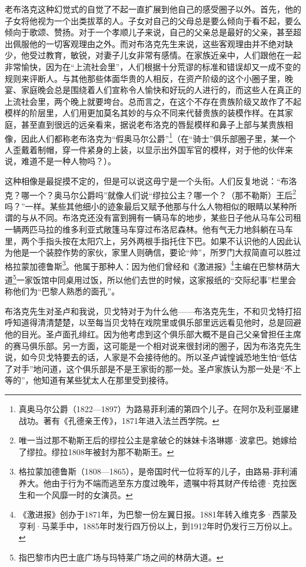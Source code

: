 \par 老布洛克这种幻觉式的自觉了不起一直扩展到他自己的感受圈子以外。首先，他的子女将他视为一个出类拔萃的人。子女对自己的父母总是要么倾向于看不起，要么倾向于歌颂、赞扬。对于一个孝顺儿子来说，自己的父亲总是最好的父亲，甚至超出佩服他的一切客观理由之外。而对布洛克先生来说，这些客观理由并不绝对缺少，他受过教育，敏锐，对妻子儿女非常有感情。在家族近亲中，人们跟他在一起非常愉快，因为在“上流社会里”，人们根据十分荒谬的标准和错误却又一成不变的规则来评断人。与其他那些体面华贵的人相反，在资产阶级的这个小圈子里，晚宴、家庭晚会总是围绕着人们宣称令人愉快和好玩的人进行的，而这些人在真正的上流社会里，两个晚上就要垮台。总而言之，在这个不存在贵族阶级又故作了不起模样的阶层里，人们用更加莫名其妙的与众不同来代替贵族的装模作样。在其家庭，甚至直到很远的远亲看来，据说老布洛克的唇髭模样和鼻子上部与某贵族相像，因此人们都称老布洛克为“假奥马尔公爵”\footnote{真奥马尔公爵（1822—1897）为路易菲利浦的第四个儿子。在阿尔及利亚屡建战功。著有《孔德亲王传》，1871年进入法兰西学院。}（在“骑士”俱乐部圈子里，某一个人歪戴着制帽，穿一件紧身的上装，以显示出外国军官的模样，对于他的伙伴来说，难道不是一种人物吗？）。
\par 这种相像是最捉摸不定的，但是可以说这毋宁是一个头衔。人们反复地说：“布洛克？哪一个？奥马尔公爵吗”就像人们说“缪拉公主？哪一个？（那不勒斯）王后\footnote{唯一当过那不勒斯王后的缪拉公主是拿破仑的妹妹卡洛琳娜·波拿巴。她嫁给了缪拉。缪拉1808年被封为那不勒斯王。}吗？”一样。某些其他细小的迹象最后又赋予他那与什么人物相似的眼睛以某种所谓的与从不同。布洛克还没有富到拥有一辆马车的地步，某些日子他从马车公司租一辆两匹马拉的维多利亚式敞篷马车穿过布洛尼森林。他有气无力地斜躺在马车里，两个手指头按在太阳穴上，另外两根手指托住下巴。如果不认识他的人因此认为他是一个装腔作势的家伙，家里人则确信，要论“帅”，所罗门大叔简直可以胜过格拉蒙加德鲁斯\footnote{格拉蒙加德鲁斯（1808—1865），是帝国时代一位将军的儿子，由路易-菲利浦养大。他由于行为不端而逃至东方度过晚年，遗嘱中将其财产传给德·克拉医生和一个风靡一时的女演员。}。他属于那种人：因为他们曾经和《激进报》\footnote{《激进报》创办于1871年，为巴黎一份左翼日报。1881年转入维克多·西蒙及亨利·马莱手中，1885年时发行四万份以上，到1912年时仍发行三万份以上。}主编在巴黎林荫大道\footnote{指巴黎市内巴士底广场与玛特莱广场之间的林荫大道。}一家饭馆中同桌用过饭，所以他们去世的时候，这家报纸的“交际纪事”栏里会称他们为“巴黎人熟悉的面孔”。
\par 布洛克先生对圣卢和我说，贝戈特对于为什么他——布洛克先生，不和贝戈特打招呼知道得清清楚楚，以至每当贝戈特在戏院里或俱乐部里远远看见他时，总是回避他的目光。圣卢面孔绯红。因为他考虑到这个俱乐部大概不是自己父亲曾担任主席的赛马俱乐部。另一方面，这可能是一个相对说来很封闭的圈子，因为布洛克先生说，如今贝戈特要去的话，人家是不会接待他的。所以圣卢诚惶诚恐地生怕“低估了对手”地问道，这个俱乐部是不是王家街的那一处。圣卢家族认为那一处是“不上等的”，他知道有某些犹太人在那里受到接待。
